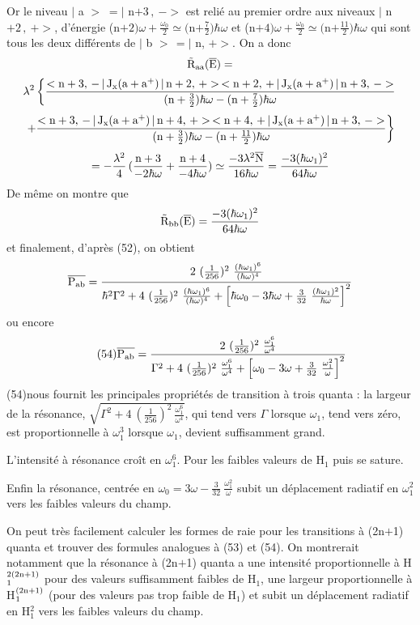 Or le niveau $|$ a $>\;=|$ n$+3\,,\ ->$ est relié au premier ordre aux
niveaux $|$ n$+2\,,\ +>$, d'énergie (n$+2)\omega+\frac{\omega_0}{2}\simeq($n$+\frac{7}{2})\hbar\omega$ et
(n$+4)\omega+\frac{\omega_0}{2}\simeq($n$+\frac{11}{2})\hbar\omega$ qui sont tous les deux différents
de $|$ b $>\,=|$ n, $+>$.
On a donc
\[
\tilde{\text{R}}_{\text{aa}}(\overline{\text{E}})=
\]
\[
\lambda^2\left\{\frac{<\text{n}+3,\,-\,|\,\text{J}_{\text{x}}(\text{a}+\text{a}^+)\,|
\,\text{n}+2,\,+>\,<\text{n}+2,\,+\,|\,\text{J}_{\text{x}}(\text{a}+\text{a}^+)\,|\,\text{n}+3,\,->}
{(\text{n}+\frac{3}{2})\hbar\omega-(\text{n}+\frac{7}{2})\hbar\omega}\right.
\]
\[
\left.+\frac{<\text{n}+3,\,-\,|\,\text{J}_{\text{x}}(\text{a}+\text{a}^+)\,|
\,\text{n}+4,\,+>\,<\text{n}+4,\,+\,|\,\text{J}_{\text{x}}(\text{a}+\text{a}^+)\,|\,\text{n}+3,\,->}
{(\text{n}+\frac{3}{2})\hbar\omega-(\text{n}+\frac{11}{2})\hbar\omega}\right\}
\]
\[
=-\frac{\lambda^2}{4}\,(\frac{\text{n}+3}{-2\hbar\omega}+\frac{\text{n}+4}{-4\hbar\omega})
\simeq\frac{-3\lambda^2\overline{\text{N}}}{16\hbar\omega}
=\frac{-3(\hbar\omega_1)^2}{64\hbar\omega}
\]
De même on montre que
\[
\tilde{\text{R}}_{\text{bb}}(\overline{\text{E}})=\frac{-3(\hbar\omega_1)^2}{64\hbar\omega}
\]
et finalement, d'après (52), on obtient
\[
\overline{\mt{P}_\mt{ab}}=\frac{2\ (\frac{1}{256})^2\ \frac{(\hbar\omega_1)^6}{(\hbar\omega)^4}}
{\hbar^2\Gamma^2+4\ (\frac{1}{256})^2\ \frac{(\hbar\omega_1)^6}{(\hbar\omega)^4}+
\left[\hbar\omega_0-3\hbar\omega+\frac{3}{32}\ \frac{(\hbar\omega_1)^2}{\hbar\omega}\right]^2}
\]
ou encore
\[
\tag{54}\overline{\mt{P}_\mt{ab}}=\frac{2\ (\frac{1}{256})^2\ \frac{\omega_1^6}{\omega^4}}
{\Gamma^2+4\ (\frac{1}{256})^2\ \frac{\omega_1^6}{\omega^4}+
\left[\omega_0-3\omega+\frac{3}{32}\ \frac{\omega_1^2}{\omega}\right]^2}
\]
(54)nous fournit les principales propriétés de  transition à trois quanta :
la largeur de la résonance, $\sqrt{\Gamma^2+4\ (\frac{1}{256})^2\ \frac{\omega_1^6}{\omega^4}}$, qui tend vers
$\Gamma$ lorsque $\omega_1$, tend vers zéro, est proportionnelle à $\omega_1^3$  lorsque $\omega_1$, devient
suffisamment grand.

L'intensité à résonance croît en $\omega_1^6$. Pour les faibles valeurs de H$_1$ puis se sature.

Enfin la résonance, centrée en $\omega_0=3\omega-\frac{3}{32}\ \frac{\omega_1^2}{\omega}$ subit un
déplacement radiatif en $\omega_1^2$ vers les faibles valeurs du champ.

On peut très facilement calculer les formes de raie pour les transitions à (2n$+$1) quanta
et trouver des formules analogues à (53) et (54).
On montrerait notamment que la résonance à (2n$+$1) quanta a une intensité
proportionnelle à H$_1^{2(2\text{n}+1)}$ pour des valeurs suffisamment faibles de H$_1$, une
largeur proportionnelle à H$_1^{(2\text{n}+1)}$ (pour des valeurs pas trop faible de H$_1$)
et subit un déplacement radiatif en H$_1^2$ vers les faibles valeurs du champ.


